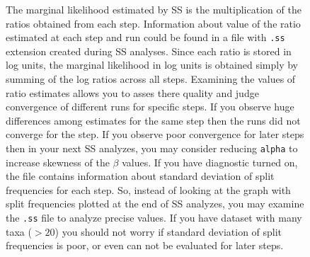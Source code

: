 \documentclass[12pt]{book}
\newcommand{\ttt}[1]{\texttt{#1}}
\begin{document}
\begin{figure}[h]
The marginal likelihood estimated by SS is the multiplication of the ratios obtained from each
step. Information about value of the ratio estimated at each step and run could be found in a file
with \ttt{.ss} extension created during SS analyses. Since each ratio is stored in log units, the
marginal likelihood in log units is obtained simply by summing of the log ratios across all steps.
Examining the values of ratio estimates allows you to asses there quality and judge convergence of
different runs for specific steps. If you observe huge differences among estimates for the same
step then the runs did not converge for the step. If you observe poor convergence for later steps
then in your next SS analyzes, you may consider reducing \ttt{alpha} to increase skewness of the
$\beta$ values. If you have diagnostic turned on, the file contains information about standard
deviation of split frequencies for each step. So, instead of looking at the graph with split
frequencies plotted at the end of SS analyzes, you may examine the \ttt{.ss} file to analyze
precise values. If you have dataset with many taxa ($>20$) you should not worry if standard
deviation of split frequencies is poor, or even can not be evaluated for later steps.



\end{figure}
\end{document}
